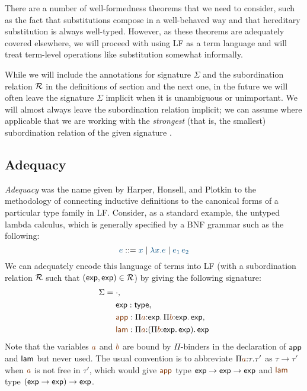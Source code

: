There are a number of well-formedness theorems that we need to
consider, such as the fact that substitutions compose in a
well-behaved way and that hereditary substitution is always
well-typed.  However, as these theorems are adequately covered
elsewhere, we will proceed with using LF as a term language and will 
treat term-level operations like substitution somewhat informally.

While we will include the annotations for signature $\Sigma$
and the subordination relation $\mathcal R$ in the definitions of section
and the next one, in the future we will often leave the signature
$\Sigma$ implicit when it is unambiguous or unimportant. We will
almost always leave the subordination relation implicit; we can assume
where applicable that we are working with the {\it strongest} (that
is, the smallest) subordination relation of the given signature
\cite{harper07mechanizing}.

\subsection{Adequacy}
\label{sec:lf-adequacy}

{\it Adequacy} was the name given by Harper, Honsell, and Plotkin to
the methodology of connecting inductive definitions to the canonical
forms of a particular type family in LF. Consider, as a standard
example, the untyped lambda calculus, which is generally specified by
a BNF grammar such as the following:
\[
\obj{e} ::= \obj{x} \mid \obj{\lambda x.e} \mid \obj{e_1\,e_2}
\]
We can adequately encode this language of terms into LF (with a
subordination relation $\mathcal R$ such that $({\sf exp}, {\sf
  exp}) \in \mathcal R$) by giving the following signature:
\begin{align*}
\Sigma & = \cdot, 
\\
 & ~\quad {\sf exp} : {\sf type}, 
\\
 & ~\quad \lf{\sf app} : 
     \lfpi{a}{{\sf exp}}{\,\lfpi{b}{\sf exp}{\,\sf exp}},
\\
 & ~\quad \lf{\sf lam} : 
     \lfpi{a}{(\lfpi{b}{\sf exp}{\,\sf exp})}{\,\sf exp}
\end{align*}
Note that the variables $\lf{a}$ and $\lf{b}$ are bound by
$\Pi$-binders in the declaration of ${\sf app}$ and ${\sf lam}$ but
never used. The usual convention is to abbreviate
$\lfpi{a}{\tau}{\tau'}$ as $\tau \rightarrow \tau'$ when $\lf{a}$ is
not free in $\tau'$, which would give $\lf{\sf app}$ type ${\sf exp}
\rightarrow {\sf exp} \rightarrow {\sf exp}$ and $\lf{\sf lam}$ type
$({\sf exp} \rightarrow {\sf exp}) \rightarrow {\sf exp}$.

